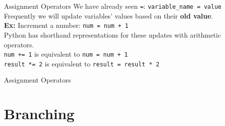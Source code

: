         \begin{frame}{Assignment Operators}
            \LARGE
            We have already seen \texttt{\textquotesingle=\textquotesingle}: \texttt{variable\_name = value}\\
            Frequently we will update variables' values based on their \textbf{old value}.\\
            \textbf{Ex:} Increment a number: \texttt{num = num + 1}\\
            Python has shorthand representations for these updates with arithmetic operators.\\
            \texttt{num += 1} is equivalent to \texttt{num = num + 1}\\
            \texttt{result *= 2} is equivalent to \texttt{result = result * 2}\\
        \end{frame}

        \begin{frame}{Assignment Operators}
            \LARGE
			\begin{table}[]
			\end{table}
        \end{frame}

    \section{Branching}

